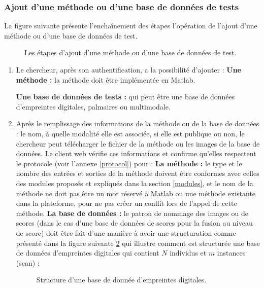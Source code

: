 \subsubsection{Ajout d’une méthode ou d’une base de données de tests}
La figure suivante présente l’enchaînement des étapes l’opération de l’ajout d’une méthode ou d’une base de données de test. 
\begin{figure}[H]
	\centering
	\caption{Les étapes d'ajout d'une méthode ou d'une base de données de test.}
	\label{schemalancettestajout}
\end{figure}
\begin{enumerate}
	\item Le chercheur, après son authentification, a la possibilité d’ajouter : 
	\subitem \textbf{Une méthode :} la méthode doit être implémentée en Matlab.

	\subitem \textbf{Une base de données de tests :} qui peut être une base de données d'empreintes digitales, palmaires ou multimodale.

	\item Après le remplissage des informations de la méthode ou de la base de données : le nom, à quelle modalité elle est associée, si elle est publique ou non, le chercheur peut télécharger le fichier de la méthode ou les images de la base de données. Le client web vérifie ces informations et confirme qu'elles respectent le protocole (voir l'annexe \ref{protocol}) pour :
	\subitem \textbf{La méthode :} le type et le nombre des entrées et sorties de la méthode doivent être conformes avec celles des modules proposés et expliqués dans la section \ref{modules}, et le nom de la méthode ne doit pas être un mot réservé à Matlab ou une méthode existante dans la plateforme, pour ne pas créer un conflit lors de l’appel de cette méthode.
	\subitem \textbf{La base de données :} le patron de nommage des images ou de scores (dans le cas d’une base de données de scores pour la fusion au niveau de score) doit être fait d'une manière à avoir une structuration comme présenté dans la figure suivante \ref{schemastructurebdd} qui illustre comment est structurée une base de données d’empreintes digitales qui contient $ N $ individus et $ m $ instances (scan) :
	\begin{figure}[H]
		\centering
		\caption{Structure d'une base de donnée d'empreintes digitales.}
		\label{schemastructurebdd}
	\end{figure}
	

\end{enumerate}
